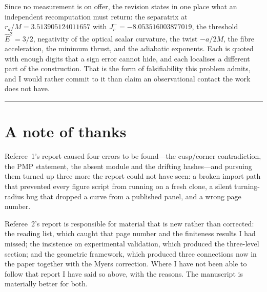 \documentclass[11pt]{article}
\begin{document}
Since no measurement is on offer, the revision states in one place what an
independent recomputation must return: the separatrix at
$r_d/M=3.513905124011657$ with $J_c^-=-8.053516003877019$, the threshold
$\hat E^2=3/2$, negativity of the optical scalar curvature, the twist $-a/2M$, the
fibre acceleration, the minimum thrust, and the adiabatic exponents. Each is quoted
with enough digits that a sign error cannot hide, and each localises a different part
of the construction. That is the form of falsifiability this problem admits, and I
would rather commit to it than claim an observational contact the work does not have.

\bigskip\hrule
\section*{A note of thanks}

Referee~1's report caused four errors to be found---the cusp/corner contradiction,
the PMP statement, the absent module and the drifting hashes---and pursuing them
turned up three more the report could not have seen: a broken import path that
prevented every figure script from running on a fresh clone, a silent turning-radius
bug that dropped a curve from a published panel, and a wrong page number.

Referee~2's report is responsible for material that is new rather than corrected: the
reading list, which caught that page number and the finiteness results I had missed;
the insistence on experimental validation, which produced the three-level section;
and the geometric framework, which produced three connections now in the paper
together with the Myers correction. Where I have not been able to follow that report
I have said so above, with the reasons. The manuscript is materially better for both.
\end{document}
